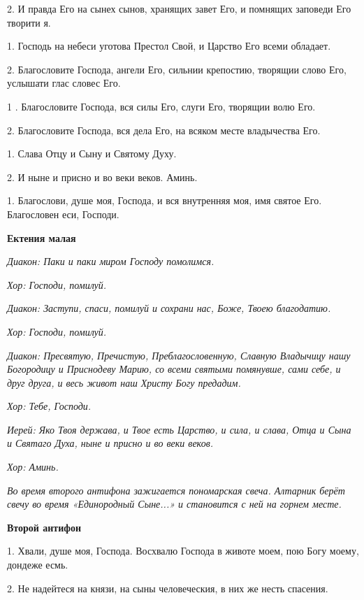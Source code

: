 2. И правда Его на сынех сынов, хранящих завет Его, и помнящих заповеди Его творити я. 


1. Господь на небеси уготова Престол Свой, и Царство Его всеми обладает. 


2. Благословите Господа, ангели Его,  сильнии крепостию, творящии слово Его, услышати глас словес Его. 


1 . Благословите Господа, вся силы Его, слуги Его, творящии волю Его. 


2. Благословите Господа, вся дела Его, на всяком месте владычества Его. 


1. Слава Отцу и Сыну и Святому Духу. 


2. И ныне и присно и во веки веков. Аминь. 


1. Благослови, душе моя, Господа, и вся внутренняя моя, имя святое Его. Благословен еси, Господи.


\medskip
\bfseries Ектения малая \normalfont{}\nopagebreak


\medskip
\itshape Диакон:\normalfont{} Паки и паки миром Господу помолимся. 


\itshape Хор:\normalfont{} Господи, помилуй. 


\itshape Диакон:\normalfont{} Заступи, спаси, помилуй и сохрани нас, Боже, Твоею благодатию. 


\itshape Хор:\normalfont{} Господи, помилуй. 


\itshape Диакон:\normalfont{} Пресвятую, Пречистую, Преблагословенную, Славную Владычицу нашу Богородицу и Приснодеву Марию, со всеми святыми помянувше, сами себе, и друг друга, и весь живот наш Христу Богу предадим. 


\itshape Хор:\normalfont{} Тебе, Господи. 


\itshape Иерей:\normalfont{} Яко Твоя держава, и Твое есть Царство, и сила, и слава, Отца и Сына и Святаго Духа, ныне и присно и во веки веков. 


\itshape Хор:\normalfont{} Аминь. 


\itshape Во время второго антифона зажигается пономарская свеча. Алтарник берёт свечу во время «Единородный Сыне...» и становится с ней на горнем месте.\normalfont{}


\medskip
\bfseries Второй антифон \normalfont{}\nopagebreak


1. Хвали, душе моя, Господа. Восхвалю Господа в животе моем, пою Богу моему, дондеже есмь. 


2. Не надейтеся на князи, на сыны человеческия, в них же несть спасения. 


